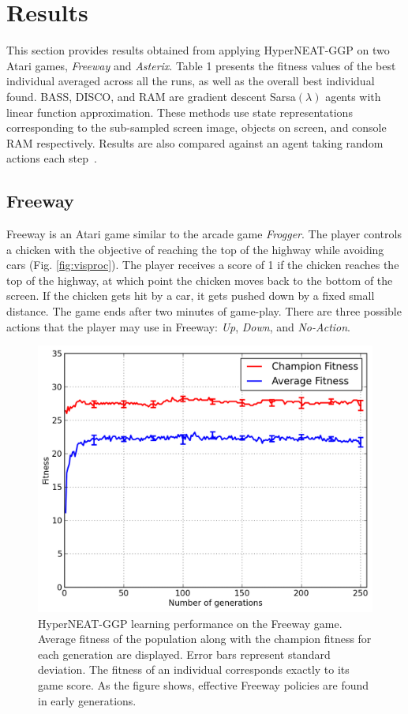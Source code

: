 \documentclass{acm_proc_article-sp}
\begin{document}
\section{Results}
\label{sec:results}
This section provides results obtained from applying HyperNEAT-GGP on two Atari games, \textit{Freeway} and \textit{Asterix}. Table 1 presents the fitness values of the best individual averaged across all the runs, as well as the overall best individual found. BASS, DISCO, and RAM are gradient descent Sarsa$(\lambda)$ agents with linear function approximation. These methods use state representations corresponding to the sub-sampled screen image, objects on screen, and console RAM respectively. Results are also compared against an agent taking random actions each step~\cite{naddaf10}. 

\subsection {Freeway}

Freeway is an Atari game similar to the arcade game \textit{Frogger}. The player controls a chicken with the objective of reaching the top of the highway while avoiding cars (Fig. \ref{fig:visproc}). The player receives a score of 1 if the chicken reaches the top of the highway, at which point the chicken moves back to the bottom of the screen. If the chicken gets hit by a car, it gets pushed down by a fixed small distance. The game ends after two minutes of game-play. There are three possible actions that the player may use in Freeway: \textit{Up}, \textit{Down}, and \textit{No-Action}.

\begin{figure}[ht]
\begin{center}
\includegraphics[width=\columnwidth]{figures/freeway-results.png}
\end{center}
\caption{HyperNEAT-GGP learning performance on the Freeway game. Average fitness of the population along with the champion fitness for each generation are displayed. Error bars represent standard deviation. The fitness of an individual corresponds exactly to its game score. As the figure shows, effective Freeway policies are found in early generations.}
\label{fig:freeway-curve}
\end{figure}
\end{document}
